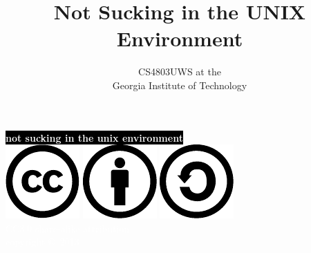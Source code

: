 \documentclass[mathserif,xcolor={dvipsnames,table}]{beamer}
\title{\textbf{Not Sucking in the UNIX Environment}}
\date{}
\author{CS4803UWS at the\\
Georgia Institute of Technology
}
\begin{document}
{
%
\begin{frame}[plain]
\textcolor{white}{
%
\colorbox{black}{\textbf{not sucking in the unix environment}}
}
\vspace{2.7in}
\\
\hfill\includegraphics[scale=.25]{images/cc-logo.pdf}
\includegraphics[scale=.25]{images/cc-new.pdf}
\includegraphics[scale=.25]{images/cc-share.pdf}
\textcolor{white}{
\\
\hfill \tiny{CC3.0 share-alike attribution}\\
}
\textcolor{white}{
\hfill \scriptsize{copyright \copyright\ 2013}\\
}
\end{frame}
}
\end{document}
